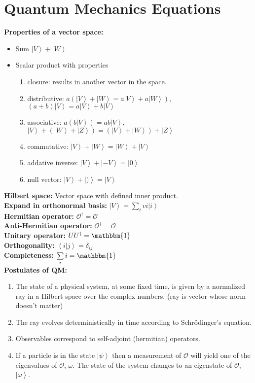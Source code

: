 \documentclass[12pt]{extarticle}
\newcommand{\ket}[1]{\left| #1 \right>}
\newcommand{\braket}[2]{\left< #1 | #2 \right>}
\begin{document}
\section{Quantum Mechanics Equations}
\textbf{Properties of a vector space:}
\begin{itemize}
  \item Sum $\ket{V} + \ket{W}$
  \item Scalar product with properties
  \begin{enumerate}
    \item closure: results in another vector in the space.
    \item distributive: $a(\ket{V}+\ket{W} = a\ket{V}+a\ket{W})$, $(a+b)\ket{V}=a\ket{V}+b\ket{V}$
    \item associative: $a(b\ket{V}) = ab\ket{V}$, $\ket{V}+(\ket{W}+\ket{Z})=(\ket{V}+\ket{W})+\ket{Z}$
    \item commutative: $\ket{V} + \ket{W} = \ket{W} + \ket{V}$
    \item addative inverse: $\ket{V} + \ket{-V} = \ket{0}$
    \item null vector: $\ket{V} + \ket{)} = \ket{V}$
  \end{enumerate}
\end{itemize}
\textbf{Hilbert space:} Vector space with defined inner product. \\
\textbf{Expand in orthonormal basis:}  $\ket{V} = \sum\limits_i vi \ket{i}$ \\
\textbf{Hermitian operator:} $\mathcal{O}^\dagger = \mathcal{O}$ \\
\textbf{Anti-Hermitian operator:} $\mathcal{O}^\dagger = \mathcal{O}$ \\
\textbf{Unitary operator:} $UU^\dagger = \mathbbm{1}$ \\
\textbf{Orthogonality:} $\braket{i}{j} = \delta_{ij}$ \\
\textbf{Completeness:} $\sum\limits_ii = \mathbbm{1}$ \\
\textbf{Postulates of QM: }
\begin{enumerate}
  \item  The state of a physical system, at some fixed time, is given by a normalized ray in a Hilbert space over the complex numbers. (ray is vector whose norm doesn't matter)
  \item The ray evolves deterministically in time according to Schr\"odinger’s equation.
  \item Observables correspond to self-adjoint (hermitian) operators.
  \item If a particle is in the state $\ket{\psi}$ then a measurement of $\mathcal{O}$ will yield one of the eigenvalues of $\mathcal{O}$, $\omega$. The state of the system changes to an eigenstate of $\mathcal{O}$, $\ket{\omega}$.
\end{enumerate}
\end{document}
